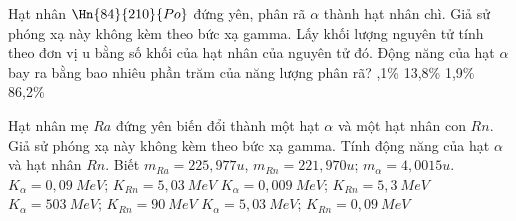 \begin{vidu}%
Hạt nhân $\Hn{84}{210}{Po}$ đứng yên, phân rã $\alpha$ thành hạt nhân chì. Giả sử phóng xạ này không kèm theo bức xạ gamma.  Lấy khối lượng nguyên tử tính theo đơn vị u bằng số khối của hạt nhân của nguyên tử đó. Động năng của hạt $\alpha$ bay ra bằng bao nhiêu phần trăm của năng lượng phân rã?
\choice
{,1\%}
{13,8\%}
{1,9\%}
{86,2\%}
\end{vidu}
\begin{vidu}%
Hạt nhân mẹ $Ra$ đứng yên biến đổi thành một hạt $\alpha$ và một hạt nhân con $Rn$. Giả sử phóng xạ này không kèm theo bức xạ gamma. Tính động năng của hạt $\alpha$ và hạt nhân $Rn$. Biết $m_{Ra}=225,977u$, $m_{Rn}=221,970u$; $m_\alpha=4,0015u$.
\choice
{$K_\alpha =0,09\ MeV$; $K_{Rn}=5,03\ MeV$}
{$K_\alpha =0,009\ MeV$; $K_{Rn}=5,3\ MeV$}
{$K_\alpha =503\ MeV$; $K_{Rn}=90\ MeV$}
{\True $K_\alpha =5,03\ MeV$; $K_{Rn}=0,09\ MeV$}
\end{vidu}
